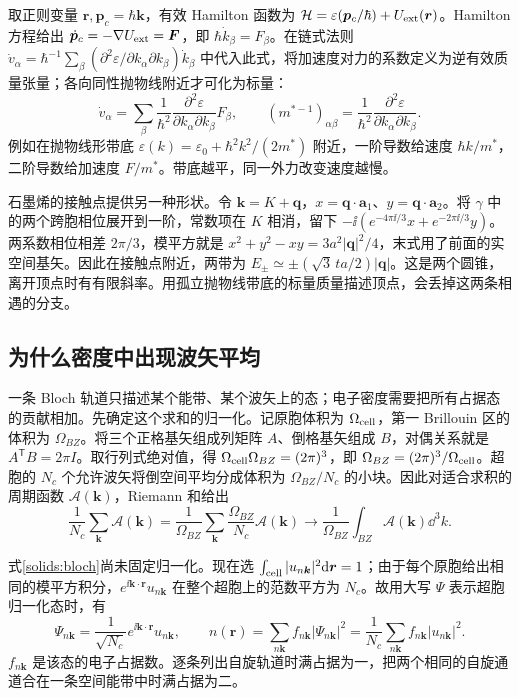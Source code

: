 取正则变量 $\bm r,\bm p_c=\hbar\bm k$，有效 Hamilton 函数为 $\mathcal H=\varepsilon(\bm p_c/\hbar)+U_{\rm ext}(\bm r)$。Hamilton 方程给出 $\dot{\bm p}_c=-\nabla U_{\rm ext}=\bm F$，即 $\hbar\dot k_\beta=F_\beta$。在链式法则 $\dot v_\alpha=\hbar^{-1}\sum_\beta(\partial^2\varepsilon/\partial k_\alpha\partial k_\beta)\dot k_\beta$ 中代入此式，将加速度对力的系数定义为逆有效质量张量；各向同性抛物线附近才可化为标量：
\begin{equation}
\dot v_\alpha=\sum_\beta\frac1{\hbar^2}\frac{\partial^2\varepsilon}{\partial k_\alpha\partial k_\beta}F_\beta,
\qquad (m^{*-1})_{\alpha\beta}=\frac1{\hbar^2}\frac{\partial^2\varepsilon}{\partial k_\alpha\partial k_\beta}.
\end{equation}
例如在抛物线形带底 $\varepsilon(k)=\varepsilon_0+\hbar^2k^2/(2m^*)$ 附近，一阶导数给速度 $\hbar k/m^*$，二阶导数给加速度 $F/m^*$。带底越平，同一外力改变速度越慢。

石墨烯的接触点提供另一种形状。令 $\bm k=K+\bm q$，$x=\bm q\cdot\bm a_1$、$y=\bm q\cdot\bm a_2$。将 $\gamma$ 中的两个跨胞相位展开到一阶，常数项在 $K$ 相消，留下 $-\ii(e^{-4\pi\ii/3}x+e^{-2\pi\ii/3}y)$。两系数相位相差 $2\pi/3$，模平方就是 $x^2+y^2-xy=3a^2|\bm q|^2/4$，末式用了前面的实空间基矢。因此在接触点附近，两带为 $E_\pm\simeq\pm(\sqrt3\,ta/2)|\bm q|$。这是两个圆锥，离开顶点时有有限斜率。用孤立抛物线带底的标量质量描述顶点，会丢掉这两条相遇的分支。

\subsection{为什么密度中出现波矢平均}
一条 Bloch 轨道只描述某个能带、某个波矢上的态；电子密度需要把所有占据态的贡献相加。先确定这个求和的归一化。记原胞体积为 $\Omega_{\rm cell}$，第一 Brillouin 区的体积为 $\Omega_{BZ}$。将三个正格基矢组成列矩阵 $A$、倒格基矢组成 $B$，对偶关系就是 $A^{\mathsf T}B=2\pi I$。取行列式绝对值，得 $\Omega_{\rm cell}\Omega_{BZ}=(2\pi)^3$，即 $\Omega_{BZ}=(2\pi)^3/\Omega_{\rm cell}$。超胞的 $N_c$ 个允许波矢将倒空间平均分成体积为 $\Omega_{BZ}/N_c$ 的小块。因此对适合求积的周期函数 $\mathcal A(\bm k)$，Riemann 和给出
\begin{equation}\label{solids:bz-average}
\frac1{N_c}\sum_{\bm k}\mathcal A(\bm k)
=\frac1{\Omega_{BZ}}\sum_{\bm k}\frac{\Omega_{BZ}}{N_c}\mathcal A(\bm k)
\longrightarrow\frac1{\Omega_{BZ}}\int_{BZ}\mathcal A(\bm k)\dd^3k.
\end{equation}

式\eqref{solids:bloch}尚未固定归一化。现在选 $\int_{\rm cell}|u_{n\bm k}|^2\mathrm{d}\bm r=1$；由于每个原胞给出相同的模平方积分，$e^{\ii\bm k\cdot\bm r}u_{n\bm k}$ 在整个超胞上的范数平方为 $N_c$。故用大写 $\Psi$ 表示超胞归一化态时，有
\begin{equation}
\Psi_{n\bm k}=\frac1{\sqrt{N_c}}e^{\ii\bm k\cdot\bm r}u_{n\bm k},
\qquad
n(\bm r)=\sum_{n\bm k}f_{n\bm k}|\Psi_{n\bm k}|^2
=\frac1{N_c}\sum_{n\bm k}f_{n\bm k}|u_{n\bm k}|^2.
\end{equation}
$f_{n\bm k}$ 是该态的电子占据数。逐条列出自旋轨道时满占据为一，把两个相同的自旋通道合在一条空间能带中时满占据为二。

